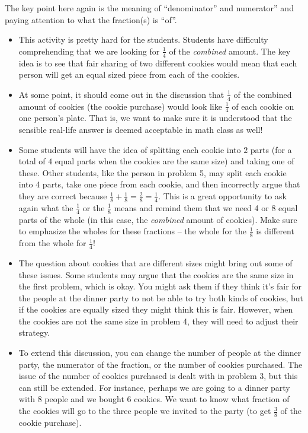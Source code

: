 \documentclass[nooutcomes,noauthor,handout]{ximera}
\begin{document}
\begin{instructorNotes}
The key point here again is the meaning of ``denominator'' and numerator'' and paying attention to what the fraction(s) is ``of''.  


 \begin{itemize}
	\item This activity is pretty hard for the students.  Students have difficulty comprehending that we are looking for $\frac14$ of the {\em combined} amount.  The key idea is to see that fair sharing of two different cookies would mean that each person will get an equal sized piece from each of the cookies. 
	\item At some point, it should come out in the discussion that $\frac14$ of the combined amount of cookies (the cookie purchase) would look like $\frac14$ of each cookie on one person's plate.  That is, we want to make sure it is understood that the sensible real-life answer is deemed acceptable in math class as well!
	\item Some students will have the idea of splitting each cookie into $2$ parts (for a total of $4$ equal parts when the cookies are the same size) and taking one of these.  Other students, like the person in problem 5,  may split each cookie into 4 parts, take one piece from each cookie, and then incorrectly argue that they are correct because $\frac{1}{8} + \frac{1}{8} = \frac{2}{8} = \frac14$.  This is a great opportunity to ask again what the $\frac14$ or the $\frac{1}{8}$ means and remind them that we need 4 or 8 equal parts of the whole (in this case, the {\em combined} amount of cookies). Make sure to emphasize the wholes for these fractions -- the whole for the $\frac{1}{8}$ is different from the whole for $\frac{1}{4}$!
	\item The question about cookies that are different sizes might bring out some of these issues. Some students may argue that the cookies are the same size in the first problem, which is okay. You might ask them if they think it's fair for the people at the dinner party to not be able to try both kinds of cookies, but if the cookies are equally sized they might think this is fair. However, when the cookies are not the same size in problem 4, they will need to adjust their strategy.
	\item To extend this discussion, you can change the number of people at the dinner party, the numerator of the fraction, or the number of cookies purchased. The issue of the number of cookies purchased is dealt with in problem 3, but this can still be extended. For instance, perhaps we are going to a dinner party with $8$ people and we bought $6$ cookies. We want to know what fraction of the cookies will go to the three people we invited to the party (to get $\frac{3}{8}$ of the cookie purchase). 

\end{itemize}
\end{instructorNotes}
\end{document}
